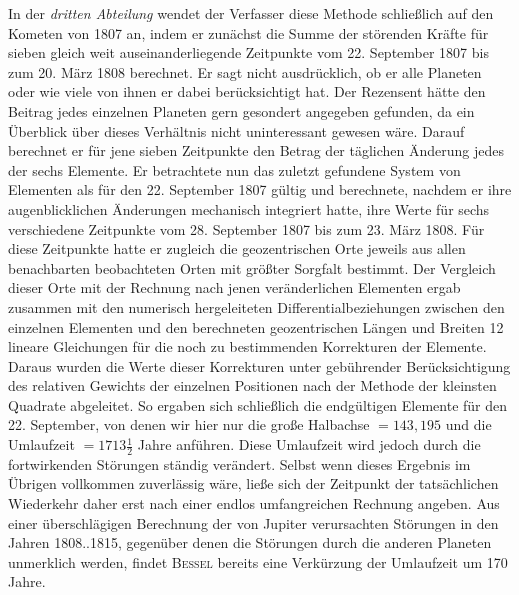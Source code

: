 In der \emph{dritten Abteilung} wendet der Verfasser diese Methode schließlich auf den Kometen von 1807 an, indem er zunächst die Summe der störenden Kräfte für sieben gleich weit auseinanderliegende Zeitpunkte vom 22. September 1807 bis zum 20. März 1808 berechnet. Er sagt nicht ausdrücklich, ob er alle Planeten oder wie viele von ihnen er dabei berücksichtigt hat. Der Rezensent hätte den Beitrag jedes einzelnen Planeten gern gesondert angegeben gefunden, da ein Überblick über dieses Verhältnis nicht uninteressant gewesen wäre. Darauf berechnet er für jene sieben Zeitpunkte den Betrag der täglichen Änderung jedes der sechs Elemente. Er betrachtete nun das zuletzt gefundene System von Elementen als für den 22. September 1807 gültig und berechnete, nachdem er ihre augenblicklichen Änderungen mechanisch integriert hatte, ihre Werte für sechs verschiedene Zeitpunkte vom 28. September 1807 bis zum 23. März 1808. Für diese Zeitpunkte hatte er zugleich die geozentrischen Orte jeweils aus allen benachbarten beobachteten Orten mit größter Sorgfalt bestimmt. Der Vergleich dieser Orte mit der Rechnung nach jenen veränderlichen Elementen ergab zusammen mit den numerisch hergeleiteten Differentialbeziehungen zwischen den einzelnen Elementen und den berechneten geozentrischen Längen und Breiten 12 lineare Gleichungen für die noch zu bestimmenden Korrekturen der Elemente. Daraus wurden die Werte dieser Korrekturen unter gebührender Berücksichtigung des relativen Gewichts der einzelnen Positionen nach der Methode der kleinsten Quadrate abgeleitet. So ergaben sich schließlich die endgültigen Elemente für den 22. September, von denen wir hier nur die große Halbachse $= 143{,}195$ und die Umlaufzeit $= 1713\tfrac{1}{2}$ Jahre anführen. Diese Umlaufzeit wird jedoch durch die fortwirkenden Störungen ständig verändert. Selbst wenn dieses Ergebnis im Übrigen vollkommen zuverlässig wäre, ließe sich der Zeitpunkt der tatsächlichen Wiederkehr daher erst nach einer endlos umfangreichen Rechnung angeben. Aus einer überschlägigen Berechnung der von Jupiter verursachten Störungen in den Jahren 1808..1815, gegenüber denen die Störungen durch die anderen Planeten unmerklich werden, findet \textsc{Bessel} bereits eine Verkürzung der Umlaufzeit um 170 Jahre.

